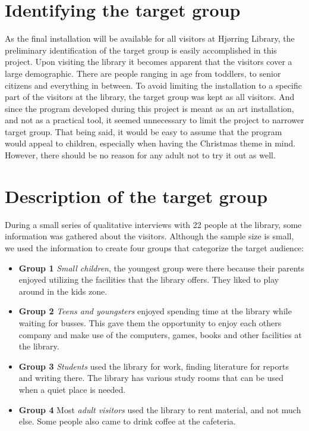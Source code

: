 \section{Identifying the target group}
As the final installation will be available for all visitors at Hj{\o}rring Library, the preliminary identification of the target group is easily accomplished in this project. Upon visiting the library it becomes apparent that the visitors cover a large demographic. There are people ranging in age from toddlers, to senior citizens and everything in between. To avoid limiting the installation to a specific part of the visitors at the library, the target group was kept as all visitors. And since the program developed during this project is meant as an art installation, and not as a practical tool, it seemed unnecessary to limit the project to narrower target group. That being said, it would be easy to assume that the program would appeal to children, especially when having the Christmas theme in mind. However, there should be no reason for any adult not to try it out as well.

\section{Description of the target group}
During a small series of qualitative interviews with 22 people at the library, some information was gathered about the visitors. Although the sample size is small, we used the information to create four groups that categorize the target audience:

\begin{itemize}

\item \textbf{Group 1} \textit{Small children}, the youngest group were there because their parents enjoyed utilizing the facilities that the library offers. They liked to play around in the kids zone.

\item \textbf{Group 2} \textit{Teens and youngsters} enjoyed spending time at the library while waiting for busses. This gave them the opportunity to enjoy each others company and make use of the computers, games, books and other facilities at the library.

\item \textbf{Group 3} \textit{Students} used the library for work, finding literature for reports and writing there. The library has various study rooms that can be used when a quiet place is needed.

\item \textbf{Group 4} Most \textit{adult visitors} used the library to rent material, and not much else. Some people also came to drink coffee at the cafeteria.

\end{itemize}

